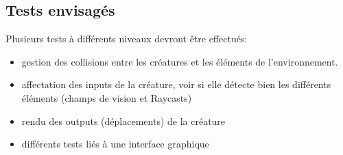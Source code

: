 \subsection{Tests envisagés}
Plusieurs tests à différents niveaux devront être effectués:
\begin{itemize}
  \item gestion des collisions entre les créatures et les éléments de l'environnement.\\
 \item affectation des inputs de la créature, voir si elle détecte bien les différents éléments (champs de vision et Raycasts)\\
 \item rendu des outputs (déplacements) de la créature
 \item différents tests liés à une interface graphique
\end{itemize}
\clearpage

